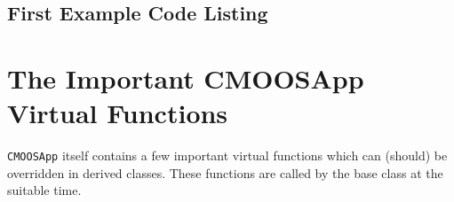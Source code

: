 \documentclass[a4paper,10pt]{article}
\newcommand{\Code}[1]{\texttt{#1} }
\newcommand{\code}[1]{\Code{#1} }
\begin{document}
\subsection{First Example Code Listing}










\section{The Important CMOOSApp Virtual Functions}\label{Sec:MOOSAppVirtuals}

\code{CMOOSApp} itself contains a few important virtual functions
which can (should) be overridden in derived classes. These
functions are called by the base class at the suitable time.
\end{document}

